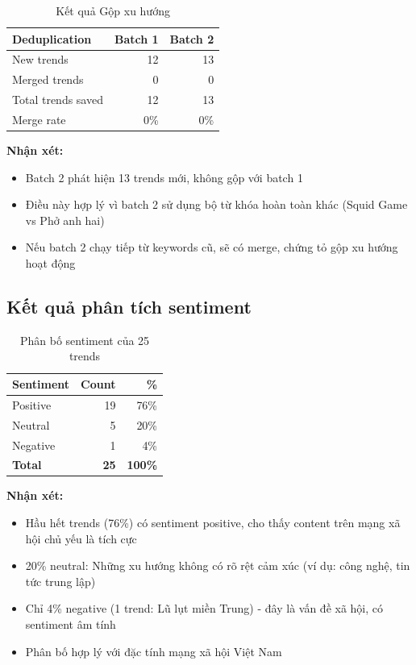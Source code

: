 \begin{table}[H]
    \centering
    \begin{tabular}{|l|r|r|}
    \hline
    \textbf{Deduplication} & \textbf{Batch 1} & \textbf{Batch 2} \\
    \hline
    New trends & 12 & 13 \\
    Merged trends & 0 & 0 \\
    Total trends saved & 12 & 13 \\
    Merge rate & 0\% & 0\% \\
    \hline
    \end{tabular}
    \caption{Kết quả Gộp xu hướng}
    \label{table:dedup_results}
\end{table}

\textbf{Nhận xét:}
\begin{itemize}
    \item Batch 2 phát hiện 13 trends mới, không gộp với batch 1
    \item Điều này hợp lý vì batch 2 sử dụng bộ từ khóa hoàn toàn khác (Squid Game vs Phở anh hai)
    \item Nếu batch 2 chạy tiếp từ keywords cũ, sẽ có merge, chứng tỏ gộp xu hướng hoạt động
\end{itemize}

\subsection{Kết quả phân tích sentiment}

\begin{table}[H]
    \centering
    \begin{tabular}{|l|r|r|}
    \hline
    \textbf{Sentiment} & \textbf{Count} & \textbf{\%} \\
    \hline
    Positive & 19 & 76\% \\
    Neutral & 5 & 20\% \\
    Negative & 1 & 4\% \\
    \hline
    \textbf{Total} & \textbf{25} & \textbf{100\%} \\
    \hline
    \end{tabular}
    \caption{Phân bố sentiment của 25 trends}
    \label{table:sentiment_results}
\end{table}

\textbf{Nhận xét:}
\begin{itemize}
    \item Hầu hết trends (76\%) có sentiment positive, cho thấy content trên mạng xã hội chủ yếu là tích cực
    \item 20\% neutral: Những xu hướng không có rõ rệt cảm xúc (ví dụ: công nghệ, tin tức trung lập)
    \item Chỉ 4\% negative (1 trend: Lũ lụt miền Trung) - đây là vấn đề xã hội, có sentiment âm tính
    \item Phân bố hợp lý với đặc tính mạng xã hội Việt Nam
\end{itemize}

